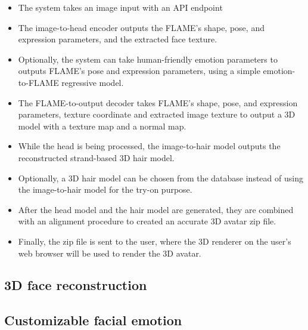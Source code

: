\begin{itemize}
    \item The system takes an image input with an API endpoint
    \item The image-to-head encoder outputs the FLAME's shape, pose, and expression parameters, and the extracted face texture.
    \item Optionally, the system can take human-friendly emotion parameters to outputs FLAME's pose and expression parameters, using a simple emotion-to-FLAME regressive model.
    \item The FLAME-to-output decoder takes FLAME's shape, pose, and expression parameters, texture coordinate and extracted image texture to output a 3D model with a texture map and a normal map.
    \item While the head is being processed, the image-to-hair model outputs the reconstructed strand-based 3D hair model.
    \item Optionally, a 3D hair model can be chosen from the database instead of using the image-to-hair model for the try-on purpose.
    \item After the head model and the hair model are generated, they are combined with an alignment procedure to created an accurate 3D avatar zip file.
    \item Finally, the zip file is sent to the user, where the 3D renderer on the user's web browser will be used to render the 3D avatar.
\end{itemize}


\subsection{3D face reconstruction}

\subsection{Customizable facial emotion}

